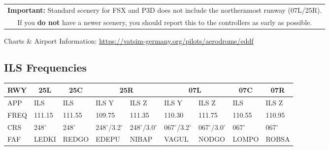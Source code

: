 \begin{table}[h]
\centering
\begin{tabular}{|c|}
\hline
\textbf{Important:} Standard scenery for FSX and P3D does not include the northernmost runway (07L/25R). \\
If you \textbf{do not} have a newer scenery, you should report this to the controllers as early as possible. \\
\hline
\end{tabular}
\end{table}
\begin{center}
Charts \& Airport Information: \url{https://vatsim-germany.org/pilots/aerodrome/eddf}
\end{center}

\newpage
\subsection{ILS Frequencies}
\begin{table}[h]
\begin{tabular}{|l|l|l|l|l|l|l|l|l|}
 \hline
RWY  & \multicolumn{1}{c|}{\textbf{25L}} & \multicolumn{1}{c|}{\textbf{25C}} & \multicolumn{2}{c|}{\textbf{25R}} & \multicolumn{2}{c|}{\textbf{07L}} & \multicolumn{1}{c|}{\textbf{07C}} & \multicolumn{1}{c|}{\textbf{07R}} \\ \hline
APP  & ILS                               & ILS                               & ILS Y           & ILS Z           & ILS Y           & ILS Z           & ILS                               & ILS Z                             \\
FREQ & 111.15                            & 111.55                            & 109.75          & 111.35          & 110.30          & 111.75          & 110.55                            & 110.95                            \\
CRS  & 248$^\circ$                              & 248$^\circ$                              & 248$^\circ$/3.2$^\circ$       & 248$^\circ$/3.0$^\circ$       & 067$^\circ$/3.2$^\circ$       & 067$^\circ$/3.0$^\circ$       & 067$^\circ$                              & 067$^\circ$                              \\
FAF  & LEDKI                             & REDGO                             & EDEPU           & NIBAP           & VAGUL           & NODGO           & LOMPO                             & ROBSA                             \\ \hline
\end{tabular}
\end{table}

